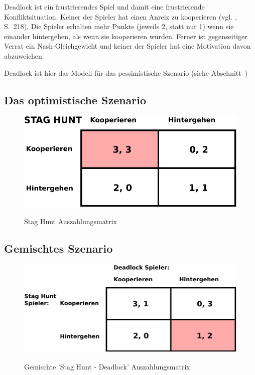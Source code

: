 {Deadlock ist ein frustrierendes Spiel und damit eine frustrierende Konfliktsituation. Keiner der Spieler hat einen Anreiz
zu kooperieren (vgl. \cite{Poundstone}, S.~218). Die Spieler erhalten mehr Punkte (jeweils 2, statt nur 1) wenn sie einander hintergehen,
als wenn sie kooperieren würden. Ferner ist gegenseitiger Verrat ein Nash-Gleichgewicht und keiner der Spieler hat eine Motivation davon
abzuweichen.

Deadlock ist hier das Modell für das pessimistische Szenario (siehe Abschnitt~\xcom)


\subsection{Das optimistische Szenario}
\begin{figure}%
\centering
\caption{Stag Hunt Auszahlungsmatrix}
\includegraphics[scale=0.8]{Grafiken/Stag_Hunt_Ink.pdf} 
\label{pic:StagHunt}
\end{figure}

\subsection{Gemischtes Szenario}
\begin{figure}%
\centering
\caption{Gemischte 'Stag Hunt - Deadlock' Auszahlungsmatrix}
\includegraphics[scale=0.8]{Grafiken/Mixed_Ink.pdf} 
\label{pic:Mixed}
\end{figure}

}
